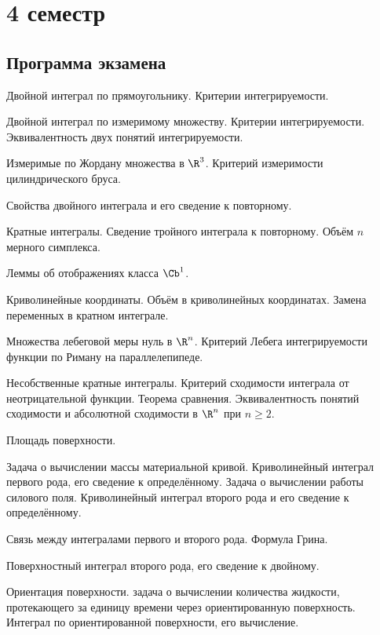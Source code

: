 \documentclass[a4paper]{article}
\begin{document}
\pagebreak

\section{4 семестр}

\subsection{Программа экзамена}

\begin{nums}{-2}
\item Двойной интеграл по прямоугольнику. Критерии интегрируемости.
\item Двойной интеграл по измеримому множеству. Критерии интегрируемости. Эквивалентность двух понятий интегрируемости.
\item Измеримые по Жордану множества в $\R^3$. Критерий измеримости цилиндрического бруса.
\item Свойства двойного интеграла и его сведение к повторному.
\item Кратные интегралы. Сведение тройного интеграла к повторному. Объём $n$\д мерного симплекса.
\item Леммы об отображениях класса $\Cb^1$.
\item Криволинейные координаты. Объём в криволинейных координатах. Замена переменных в кратном интеграле.
\item Множества лебеговой меры нуль в $\R^n$. Критерий Лебега интегрируемости функции по Риману на параллелепипеде.
\item Несобственные кратные интегралы. Критерий сходимости интеграла от неотрицательной функции. Теорема сравнения.
Эквивалентность понятий сходимости и абсолютной сходимости в $\R^n$ при $n \ge 2$.
\item Площадь поверхности.
\item Задача о вычислении массы материальной кривой. Криволинейный интеграл первого рода, его сведение к определённому.
Задача о вычислении работы силового поля. Криволинейный интеграл второго рода и его сведение к определённому.
\item Связь между интегралами первого и второго рода. Формула Грина.
\item Поверхностный интеграл второго рода, его сведение к двойному.
\item Ориентация поверхности. задача о вычислении количества жидкости, протекающего за единицу времени через
ориентированную поверхность. Интеграл по ориентированной поверхности, его вычисление.

\end{nums}
\end{document}
